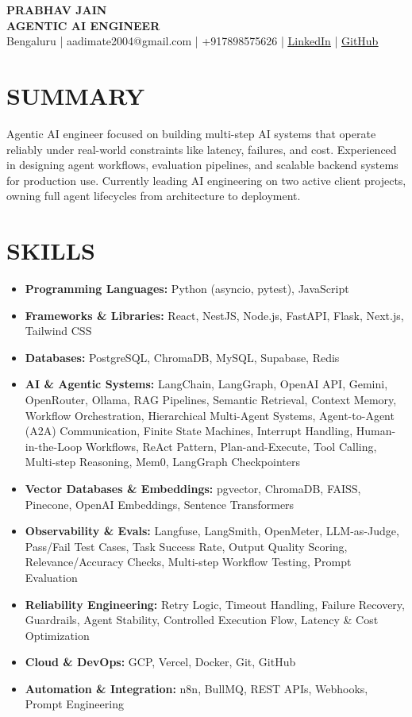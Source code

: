 \documentclass[9.5pt,a4paper]{article}
\begin{document}
{\LARGE \textbf{PRABHAV JAIN}}\\[1pt]
{\large \textbf{AGENTIC AI ENGINEER}}\\[1pt]
Bengaluru | aadimate2004@gmail.com | +917898575626 |
\href{https://www.linkedin.com/in/prabhavjain2004}{\underline{LinkedIn}} |
\href{https://github.com/prabhavjain2004}{\underline{GitHub}}

\section*{SUMMARY}
Agentic AI engineer focused on building multi-step AI systems that operate reliably under real-world constraints like latency, failures, and cost. Experienced in designing agent workflows, evaluation pipelines, and scalable backend systems for production use. Currently leading AI engineering on two active client projects, owning full agent lifecycles from architecture to deployment.

\section*{SKILLS}
\begin{itemize}
\item \textbf{Programming Languages:} Python (asyncio, pytest), JavaScript
\item \textbf{Frameworks \& Libraries:} React, NestJS, Node.js, FastAPI, Flask, Next.js, Tailwind CSS
\item \textbf{Databases:} PostgreSQL, ChromaDB, MySQL, Supabase, Redis
\item \textbf{AI \& Agentic Systems:} LangChain, LangGraph, OpenAI API, Gemini, OpenRouter, Ollama, RAG Pipelines, Semantic Retrieval, Context Memory, Workflow Orchestration, Hierarchical Multi-Agent Systems, Agent-to-Agent (A2A) Communication, Finite State Machines, Interrupt Handling, Human-in-the-Loop Workflows, ReAct Pattern, Plan-and-Execute, Tool Calling, Multi-step Reasoning, Mem0, LangGraph Checkpointers
\item \textbf{Vector Databases \& Embeddings:} pgvector, ChromaDB, FAISS, Pinecone, OpenAI Embeddings, Sentence Transformers
\item \textbf{Observability \& Evals:} Langfuse, LangSmith, OpenMeter, LLM-as-Judge, Pass/Fail Test Cases, Task Success Rate, Output Quality Scoring, Relevance/Accuracy Checks, Multi-step Workflow Testing, Prompt Evaluation
\item \textbf{Reliability Engineering:} Retry Logic, Timeout Handling, Failure Recovery, Guardrails, Agent Stability, Controlled Execution Flow, Latency \& Cost Optimization
\item \textbf{Cloud \& DevOps:} GCP, Vercel, Docker, Git, GitHub
\item \textbf{Automation \& Integration:} n8n, BullMQ, REST APIs, Webhooks, Prompt Engineering
\end{itemize}
\end{document}
